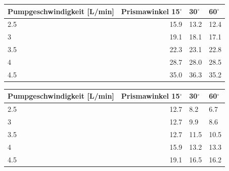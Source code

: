 \documentclass[titlepage=firstcover, captions=tableheading]{scrartcl}
\begin{document}
\begin{minipage}{\linewidth}
    \begin{table}[H]
        \centering
    
    \begin{tabular}{lrll}
        \toprule
        Pumpgeschwindigkeit [L/min] & Prismawinkel 15$^{\circ}$ & 30$^{\circ}$ & 60$^{\circ}$ \\
        \midrule
        2.5   &  15.9 &   13.2  &  12.4 \\ 
        3     &  19.1 &   18.1  &  17.1 \\ 
        3.5   &  22.3 &   23.1  &  22.8 \\ 
        4     &  28.7 &   28.0  &  28.5 \\ 
        4.5   &  35.0 &   36.3  &  35.2 \\    
        \bottomrule
        
    \end{tabular}
    \label{tab:1}
    \end{table}
    \end{minipage}

    \begin{minipage}{\linewidth}
        \begin{table}[H]
            \centering
        
        \begin{tabular}{lrll}
            \toprule
            Pumpgeschwindigkeit [L/min] & Prismawinkel 15$^{\circ}$ & 30$^{\circ}$ & 60$^{\circ}$ \\
            \midrule
            2.5   &  12.7  &  8.2   &  6.7   \\ 
            3     &  12.7  &  9.9   &  8.6   \\ 
            3.5   &  12.7  &  11.5  &  10.5  \\ 
            4     &  15.9  &  13.2  &  13.3  \\ 
            4.5   &  19.1  &  16.5  &  16.2  \\    
            \bottomrule
            
        \end{tabular}
        \label{tab:2}
        \end{table}
        \end{minipage}
\end{document}
